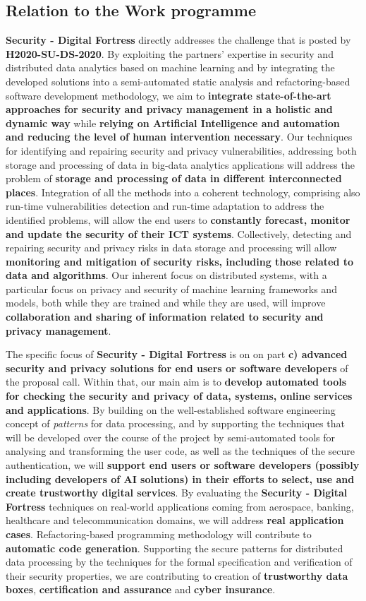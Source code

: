 \documentclass[a4paper,11pt]{article}
\newcommand{\project}[1]{\textbf{#1}\xspace}
\newcommand{\SECURITY}{\project{Security - Digital Fortress}}
\newcommand{\TheProject}{\SECURITY}
\begin{document}
\subsection{Relation to the Work programme}

\TheProject{} directly addresses the challenge that is posted by \textbf{H2020-SU-DS-2020}. By exploiting the partners' expertise in security and distributed data analytics based on machine learning and by integrating the developed solutions into a semi-automated static analysis and refactoring-based software development methodology, we aim to \textbf{integrate state-of-the-art approaches for security and privacy management in a holistic and dynamic way} while \textbf{relying on Artificial Intelligence and automation and reducing the level of human intervention necessary}. Our techniques for identifying and repairing security and privacy vulnerabilities, addressing both storage and processing of data in big-data analytics applications will address the problem of \textbf{storage and processing of data in different interconnected places}. Integration of all the methods into a coherent technology, comprising also run-time vulnerabilities detection and run-time adaptation to address the identified problems, will allow the end users to  \textbf{constantly forecast, monitor and update the security of their ICT systems}. Collectively, detecting and repairing security and privacy risks in data storage and processing will allow \textbf{monitoring and mitigation of security risks, including those related to data and algorithms}. Our inherent focus on distributed systems, with a particular focus on privacy and security of machine learning frameworks and models, both while they are trained and while they are used, will improve \textbf{collaboration and sharing of information related to security and privacy management}. 

The specific focus of \TheProject{} is on on part \textbf{c) advanced security and privacy solutions for end users or software developers} of the proposal call. Within that, our main aim is to \textbf{develop automated tools for checking the security and privacy of data, systems, online services and applications}. By building on the well-established software engineering concept of \emph{patterns} for data processing, and by supporting the techniques that will be developed over the course of the project by semi-automated tools for analysing and transforming the user code, as well as the techniques of the secure authentication, we will \textbf{support end users or software developers (possibly including developers of AI solutions) in their efforts to select, use and create trustworthy digital services}. By evaluating the \TheProject{} techniques on real-world applications coming from aerospace, banking, healthcare and telecommunication domains, we will address \textbf{real application cases}. Refactoring-based programming methodology will contribute to \textbf{automatic code generation}. Supporting the secure patterns for distributed data processing by the techniques for the formal specification and verification of their security properties, we are contributing to creation of \textbf{trustworthy data boxes}, \textbf{certification and assurance} and \textbf{cyber insurance}.
\end{document}
